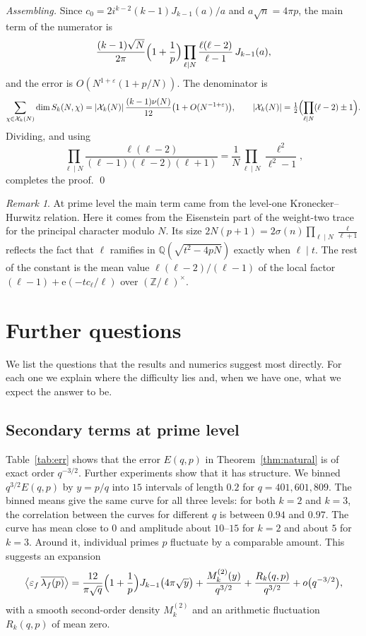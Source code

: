 \documentclass[11pt]{amsart}
\theoremstyle{remark}
\newtheorem{remark}[theorem]{Remark}
\newcommand{\eps}{\varepsilon}
\newcommand{\e}{\mathrm{e}}
\newcommand{\cX}{\mathcal{X}}
\newcommand{\ov}{\overline}
\begin{document}
\emph{Assembling.} Since $c_0=2i^{k-2}(k-1)J_{k-1}(a)/a$ and $a\sqrt n=4\pi p$, the main term of the numerator is
\[
\frac{(k-1)\sqrt N}{2\pi}\Bigl(1+\frac1p\Bigr)\prod_{\ell\mid N}\frac{\ell(\ell-2)}{\ell-1}\,J_{k-1}(a),
\]
and the error is $O(N^{1+\varepsilon}(1+p/N))$. The denominator is
\[
\sum_{\chi\in\cX_k(N)}\dim S_k(N,\chi)=|\cX_k(N)|\,\frac{(k-1)\nu(N)}{12}\bigl(1+O(N^{-1+\varepsilon})\bigr),\qquad |\cX_k(N)|=\tfrac12\Bigl(\prod_{\ell\mid N}(\ell-2)\pm1\Bigr).
\]
Dividing, and using
\[
\prod_{\ell\mid N}\frac{\ell(\ell-2)}{(\ell-1)(\ell-2)(\ell+1)}=\frac1N\prod_{\ell\mid N}\frac{\ell^2}{\ell^2-1},
\]
completes the proof. \qed

\begin{remark}
At prime level the main term came from the level-one Kronecker--Hurwitz relation. Here it comes from the Eisenstein part of the weight-two trace for the principal character modulo $N$. Its size $2N(p+1)=2\sigma(n)\prod_{\ell\mid N}\frac{\ell}{\ell+1}$ reflects the fact that $\ell$ ramifies in $\mathbb Q(\sqrt{t^2-4pN})$ exactly when $\ell\mid t$. The rest of the constant is the mean value $\ell(\ell-2)/(\ell-1)$ of the local factor $(\ell-1)+\e(-tc_\ell/\ell)$ over $(\mathbb Z/\ell)^\times$.
\end{remark}

\section{Further questions}\label{sec:questions}

We list the questions that the results and numerics suggest most directly. For each one we explain where the difficulty lies and, when we have one, what we expect the answer to be.

\subsection{Secondary terms at prime level}
Table~\ref{tab:err} shows that the error $E(q,p)$ in Theorem~\ref{thm:natural} is of exact order $q^{-3/2}$. Further experiments show that it has structure. We binned $q^{3/2}E(q,p)$ by $y=p/q$ into $15$ intervals of length $0.2$ for $q=401,601,809$. The binned means give the same curve for all three levels: for both $k=2$ and $k=3$, the correlation between the curves for different $q$ is between $0.94$ and $0.97$. The curve has mean close to $0$ and amplitude about $10$--$15$ for $k=2$ and about $5$ for $k=3$. Around it, individual primes $p$ fluctuate by a comparable amount. This suggests an expansion
\[
\bigl\langle\eps_f\,\ov{\lambda_f(p)}\bigr\rangle=\frac{12}{\pi\sqrt q}\Bigl(1+\frac1p\Bigr)J_{k-1}\bigl(4\pi\sqrt y\bigr)+\frac{M_k^{(2)}(y)}{q^{3/2}}+\frac{R_k(q,p)}{q^{3/2}}+o\bigl(q^{-3/2}\bigr),
\]
with a smooth second-order density $M_k^{(2)}$ and an arithmetic fluctuation $R_k(q,p)$ of mean zero.
\end{document}
